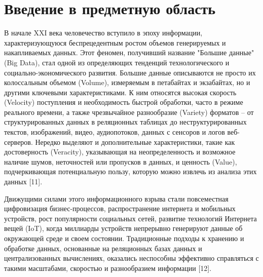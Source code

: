 \chapter{Введение в предметную область} \label{ch2}

В начале XXI века человечество вступило в эпоху информации,
характеризующуюся беспрецедентным ростом объемов генерируемых и накапливаемых данных.
Этот феномен, получивший название "Большие данные" (Big Data), стал одной из определяющих тенденций технологического и социально-экономического развития.
Большие данные описываются не просто их колоссальным объемом (Volume), измеряемым в петабайтах и экзабайтах, но и другими ключевыми характеристиками.
К ним относятся высокая скорость (Velocity) поступления и необходимость быстрой обработки, часто в режиме реального времени,
а также чрезвычайное разнообразие (Variety) форматов – от структурированных данных в реляционных таблицах до неструктурированных текстов,
изображений, видео, аудиопотоков, данных с сенсоров и логов веб-серверов.
Нередко выделяют и дополнительные характеристики, такие как достоверность (Veracity),
указывающая на неопределенность и возможное наличие шумов, неточностей или пропусков в данных, и ценность (Value), подчеркивающая потенциальную пользу, которую можно извлечь из анализа этих данных [11].

Движущими силами этого информационного взрыва стали повсеместная цифровизация бизнес-процессов, распространение интернета и мобильных устройств, рост популярности социальных сетей, развитие технологий Интернета вещей (IoT), когда миллиарды устройств непрерывно генерируют данные об окружающей среде и своем состоянии. Традиционные подходы к хранению и обработке данных, основанные на реляционных базах данных и централизованных вычислениях, оказались неспособны эффективно справляться с такими масштабами, скоростью и разнообразием информации [12].

